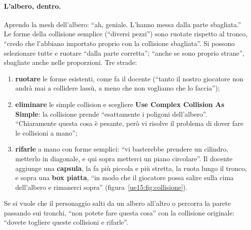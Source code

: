 \paragraph{L'albero, dentro.} Aprendo la mesh dell'albero: ``ah, geniale. L'hanno messa dalla
parte sbagliata.'' Le forme della collisione semplice (``diversi pezzi'') sono ruotate rispetto
al tronco, ``credo che l'abbiano importato proprio con la collisione sbagliata''. Si possono
selezionare tutte e ruotare ``dalla parte corretta''; ``anche se sono proprio strane'',
sbagliate anche nelle proporzioni. Tre strade:
\begin{enumerate}
  \item \textbf{ruotare} le forme esistenti, come fa il docente (``tanto il nostro giocatore
        non andrà mai a collidere lassù, a meno che non vogliamo che lo faccia'');
  \item \textbf{eliminare} le simple collision e scegliere \textbf{Use Complex Collision As
        Simple}: la collisione prende ``esattamente i poligoni dell'albero''. ``Chiaramente
        questa cosa è pesante, però vi risolve il problema di dover fare le collisioni a
        mano'';
  \item \textbf{rifarle} a mano con forme semplici: ``vi basterebbe prendere un cilindro,
        metterlo in diagonale, e qui sopra metterci un piano circolare''. Il docente aggiunge
        una \textbf{capsula}, la fa più piccola e più stretta, la ruota lungo il tronco, e
        sopra una \textbf{box piatta}, ``in modo che il giocatore possa salire sulla cima
        dell'albero e rimanerci sopra'' (figura~\ref{ue15:fig:collisione}).
\end{enumerate}
Se si vuole che il personaggio salti da un albero all'altro o percorra la parete passando sui
tronchi, ``non potete fare questa cosa'' con la collisione originale: ``dovete togliere queste
collisioni e rifarle''.

